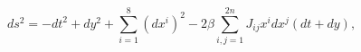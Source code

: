 \begin{equation}
\label{aftercoII}
ds^2 = - dt^2 + dy^2 + \sum_{i=1}^8 (dx^i)^2 
- 2\beta \sum_{i,j=1}^{2n} J_{ij} x^i dx^j (dt+dy),
\end{equation}

